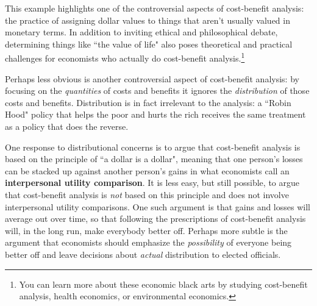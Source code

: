This example highlights one of the controversial aspects of cost-benefit analysis: the practice of assigning dollar values to things that aren't usually valued in monetary terms. In addition to inviting ethical and philosophical debate, determining things like ``the value of life" also poses theoretical and practical challenges for economists who actually do cost-benefit analysis.\footnote{You can learn more about these economic black arts by studying cost-benefit analysis, health economics, or environmental economics.}






Perhaps less obvious is another controversial aspect of cost-benefit analysis: by focusing on the \emph{quantities} of costs and benefits it ignores the \emph{distribution} of those costs and benefits. Distribution is in fact irrelevant to the analysis: a ``Robin Hood" policy that helps the poor and hurts the rich receives the same treatment as a policy that does the reverse.

One response to distributional concerns is to argue that cost-benefit analysis is based on the principle of ``a dollar is a dollar", meaning that one person's losses can be stacked up against another person's gains in what economists call an \textbf{interpersonal utility comparison}. It is less easy, but still possible, to argue that cost-benefit analysis is \emph{not} based on this principle and does not involve interpersonal utility comparisons. One such argument is that gains and losses will average out over time, so that following the prescriptions of cost-benefit analysis will, in the long run, make everybody better off. Perhaps more subtle is the argument that economists should emphasize the \emph{possibility} of everyone being better off and leave decisions about \emph{actual} distribution to elected officials.

